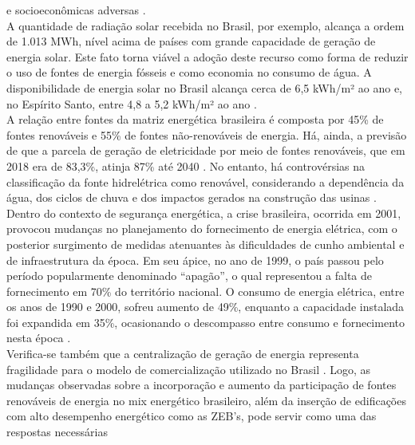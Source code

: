      e socioeconômicas adversas \cite{Pikas2014,Pikas2017}.\\
     A quantidade de radiação solar recebida no Brasil, por exemplo, alcança a ordem de 1.013 MWh, 
     nível acima de países com grande capacidade de geração de energia solar. Este fato 
     torna viável a  adoção  deste  recurso  como  forma  de  reduzir  o  uso  de  fontes  
     de  energia  fósseis  e  como economia  no  consumo  de  água.  A  disponibilidade  de  energia
     solar  no  Brasil  alcança  cerca  de 6,5 kWh/m²  ao  ano  e,  no  Espírito  Santo,  
     entre  4,8  a  5,2 kWh/m²  ao  ano \cite{AgenciadeRegulacaodeServicosPublicosdoEspiritoSanto-ARSP2019,
     Didone2014,InternationalEnergyAgency-IEA2018}.\\ 
     A relação entre fontes da matriz energética brasileira é composta por 45\% de fontes renováveis
     e 55\% de fontes não-renováveis de energia. Há, ainda, a previsão de que a parcela de geração
     de eletricidade  por  meio  de  fontes  renováveis,  que  em  2018  era  de  83,3\%,  atinja  
     87\%  até  2040 \cite{EmpresadePesquisaEnergetica-EPE2017}. No entanto, há controvérsias na 
     classificação da fonte hidrelétrica como renovável, considerando a dependência da água, 
     dos ciclos de chuva e dos impactos gerados na construção das usinas \cite{Leme2012}.\\
     Dentro  do  contexto  de  segurança  energética,  a  crise  brasileira,  ocorrida  em  2001,  
     provocou mudanças no planejamento do fornecimento de energia elétrica, com o posterior 
     surgimento de medidas  atenuantes  às dificuldades  de  cunho  ambiental  e  de  infraestrutura  
     da  época.  Em  seu ápice, no ano de 1999, o país passou pelo período popularmente denominado “apagão”, 
     o qual representou  a  falta  de  fornecimento  em  70\%  do  território  nacional.  
     O  consumo  de  energia elétrica, entre os anos de 1990 e 2000, sofreu aumento de 49\%, 
     enquanto a capacidade instalada foi expandida em 35\%, ocasionando o descompasso entre 
     consumo e fornecimento nesta época \cite{Conejero2016,Tolmasquim2000}.\\ 
     Verifica-se  também  que  a  centralização  de  geração  de  energia  representa  fragilidade  
     para  o modelo  de  comercialização  utilizado  no  Brasil \cite{Pinto2017}. 
     Logo,  as mudanças observadas sobre a incorporação e aumento da participação de fontes 
     renováveis de energia  no mix  energético  brasileiro,  além  da  inserção  de  edificações  
     com  alto  desempenho energético como as ZEB’s, pode servir como uma das respostas necessárias 
